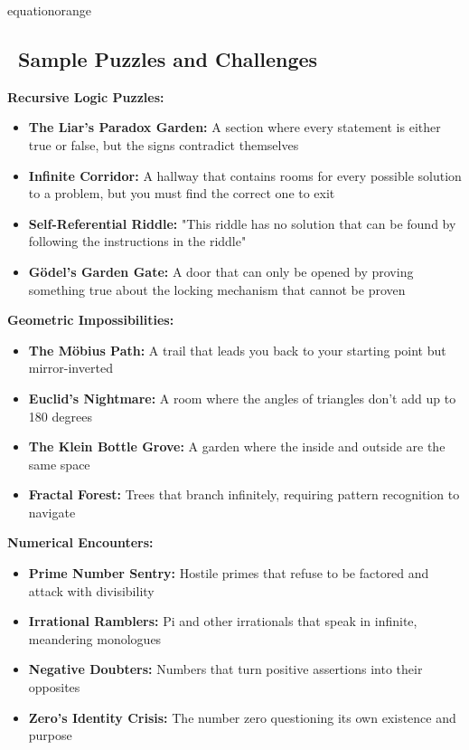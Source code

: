 \documentclass[11pt]{article}
\begin{document}
\begin{campaignsection}{equationorange}
\subsection*{\faCalculator\ Sample Puzzles and Challenges}

\textbf{Recursive Logic Puzzles:}
\begin{itemize}
    \item \textbf{The Liar's Paradox Garden:} A section where every statement is either true or false, but the signs contradict themselves
    \item \textbf{Infinite Corridor:} A hallway that contains rooms for every possible solution to a problem, but you must find the correct one to exit
    \item \textbf{Self-Referential Riddle:} "This riddle has no solution that can be found by following the instructions in the riddle"
    \item \textbf{Gödel's Garden Gate:} A door that can only be opened by proving something true about the locking mechanism that cannot be proven
\end{itemize}

\textbf{Geometric Impossibilities:}
\begin{itemize}
    \item \textbf{The Möbius Path:} A trail that leads you back to your starting point but mirror-inverted
    \item \textbf{Euclid's Nightmare:} A room where the angles of triangles don't add up to 180 degrees
    \item \textbf{The Klein Bottle Grove:} A garden where the inside and outside are the same space
    \item \textbf{Fractal Forest:} Trees that branch infinitely, requiring pattern recognition to navigate
\end{itemize}

\textbf{Numerical Encounters:}
\begin{itemize}
    \item \textbf{Prime Number Sentry:} Hostile primes that refuse to be factored and attack with divisibility
    \item \textbf{Irrational Ramblers:} Pi and other irrationals that speak in infinite, meandering monologues
    \item \textbf{Negative Doubters:} Numbers that turn positive assertions into their opposites
    \item \textbf{Zero's Identity Crisis:} The number zero questioning its own existence and purpose
\end{itemize}


\end{campaignsection}
\end{document}
